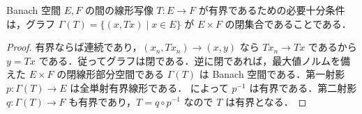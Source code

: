 \begin{prop}[閉グラフ定理]
Banach 空間 $E,F$ の間の線形写像 $T:E\to F$ が有界であるための必要十分条件は，グラフ $\Gamma(T)=\{(x,Tx)\mid x\in E\}$ が $E\times F$ の閉集合であることである．
\end{prop}
\begin{proof}
有界ならば連続であり，$(x_n,Tx_n)\to(x,y)$ なら $Tx_n\to Tx$ であるから $y=Tx$ である．従ってグラフは閉である．逆に閉であれば，最大値ノルムを備えた $E\times F$ の閉線形部分空間である $\Gamma(T)$ は Banach 空間である．第一射影 $p:\Gamma(T)\to E$ は全単射有界線形である． によって $p^{-1}$ は有界である．第二射影 $q:\Gamma(T)\to F$ も有界であり，$T=q\circ p^{-1}$ なので $T$ は有界となる．
\end{proof}
